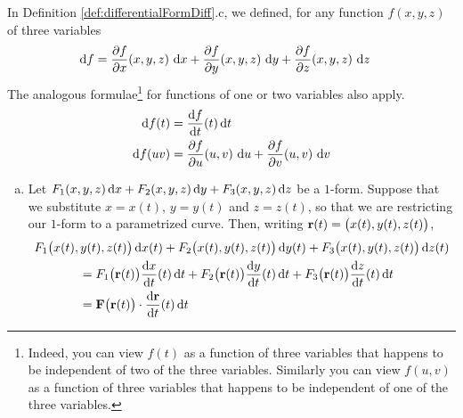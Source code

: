 \begin{eg}\label{eg:diffFormDiffB}
In Definition \ref{def:differentialFormDiff}.c, we defined,
for any function $f(x,y,z)$ of three variables
\begin{align*}
\mathrm{d}f
&=\frac{\partial f}{\partial x}(x,y,z)\ \mathrm{d}x
+\frac{\partial f}{\partial y}(x,y,z)\ \mathrm{d}y
+\frac{\partial f}{\partial z}(x,y,z)\ \mathrm{d}z
\end{align*}
The analogous formulae\footnote{Indeed, you can view $f(t)$ as a function 
of three variables that happens to be independent of two of the three 
variables. Similarly you can view $f(u,v)$  as a function of three 
variables that happens to be independent of one of the three variables.
} for functions of one or two variables also apply.
\begin{align*}
\dee{f(t)} & = \diff{f}{t}(t)\,\dee{t} \\
\dee{f(uv)}
&=\frac{\partial f}{\partial u}(u,v)\ \dee{u}
+\frac{\partial f}{\partial v}(u,v)\ \dee{v}
\end{align*}

\begin{enumerate}[(a)]
\item 
Let $F_1(x,y,z)\,\mathrm{d}x + F_2(x,y,z)\,\mathrm{d}y + F_3(x,y,z)\,\mathrm{d}z$ 
be a $1$-form. Suppose that we substitute $x=x(t)$, $y=y(t)$ and $z=z(t)$,
so that we are restricting our $1$-form to a parametrized curve.
Then, writing $\mathbf{r}(t) = \big(x(t),y(t),z(t)\big)$,
\begin{align*}
&F_1\big(x(t),y(t),z(t)\big)\,\dee{x(t)} 
  + F_2\big(x(t),y(t),z(t)\big)\,\dee{y(t)} 
  + F_3\big(x(t),y(t),z(t)\big)\,\dee{z(t)} \\
&\hskip0.5in=F_1\big(\vr(t)\big)\diff{x}{t}(t)\,\dee{t}
  + F_2\big(\vr(t)\big)\diff{y}{t}(t)\,\dee{t}
  + F_3\big(\vr(t)\big)\diff{z}{t}(t)\,\dee{t} \\
&\hskip0.5in= \vF\big(\vr(t)\big)\cdot\diff{\vr}{t}(t)\,\dee{t}
\end{align*}



\end{enumerate}
\end{eg}
